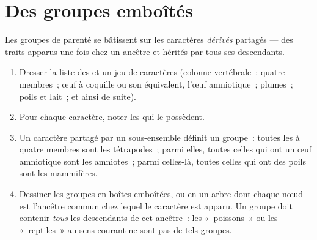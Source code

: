 \section{Des groupes emboîtés}

\begin{method}\label{met:g10:common-ancestry:grouping}
Les groupes de parenté se bâtissent sur les caractères
\emph{dérivés} partagés --- des traits apparus une fois chez un ancêtre
et hérités par tous ses descendants.
\begin{enumerate}
  \item Dresser la liste des  et un jeu de caractères (colonne
        vertébrale~; quatre membres~; œuf à coquille ou son
        équivalent, l'œuf amniotique~; plumes~; poils et lait~; et
        ainsi de suite).
  \item Pour chaque caractère, noter les  qui le possèdent.
  \item Un caractère partagé par un sous-ensemble définit un groupe~:
        toutes les  à quatre membres sont les tétrapodes~; parmi
        elles, toutes celles qui ont un œuf amniotique sont les
        amniotes~; parmi celles-là, toutes celles qui ont des poils
        sont les mammifères.
  \item Dessiner les groupes en boîtes emboîtées, ou en un arbre dont
        chaque nœud est l'ancêtre commun chez lequel le caractère
        est apparu. Un groupe doit contenir \emph{tous} les
        descendants de cet ancêtre~: les «~poissons~» ou les
        «~reptiles~» au sens courant ne sont pas de tels groupes.
\end{enumerate}
\end{method}

